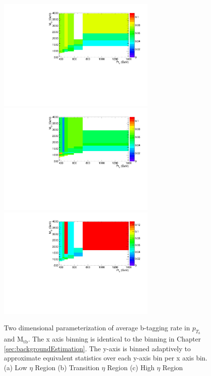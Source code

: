 \begin{figure}[htcb]
\begin{center}
\includegraphics[width=0.7\textwidth]{AN-13-004/figs/TagrateEta1SB2dSB1.pdf}
\includegraphics[width=0.7\textwidth]{AN-13-004/figs/TagrateEta2SB2dSB1.pdf}
\includegraphics[width=0.7\textwidth]{AN-13-004/figs/TagrateEta3SB2dSB1.pdf}
\caption{
Two dimensional parameterization of average b-tagging rate in $p_{T_{b}}$ and $\mathrm{M_{tb}}$.  The x axis binning is identical to the binning in Chapter \ref{sec:backgroundEstimation}.  
The y-axis is binned adaptively to approximate equivalent statistics over each y-axis bin per x axis bin. 
(a) Low $\eta$ Region
(b) Transition $\eta$ Region
(c) High $\eta$ Region
}
\label{figs:sb2deta}
\end{center}
\end{figure}

